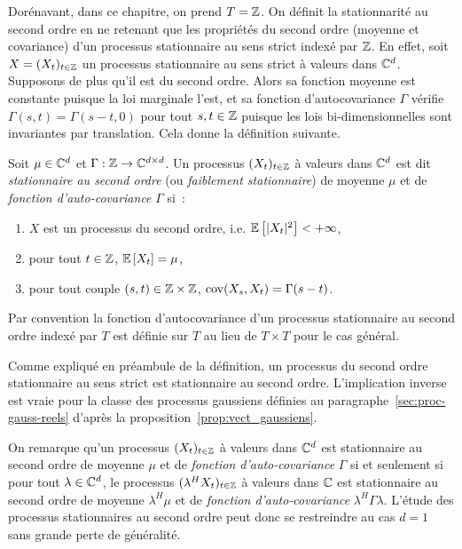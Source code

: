 Dor\'enavant, dans ce chapitre, on prend $T=\mathbb{Z}$.  On d\'efinit la stationnarit\'e
au second ordre en ne retenant que les propri\'et\'es du second ordre (moyenne et
covariance) d'un processus stationnaire au sens strict index\'e par $\mathbb{Z}$.  En
effet, soit $X=(X_{t})_{t \in \mathbb{Z}}$ un processus stationnaire au sens strict
\`a valeurs dans $\mathbb{C}^d$. Supposons de plus qu'il est du second ordre. Alors sa
fonction moyenne est constante puisque la loi marginale l'est, et sa fonction
d'autocovariance $\Gamma$ v\'erifie $\Gamma(s,t)=\Gamma(s-t,0)$ pour tout
$s,t\in\mathbb{Z}$ puisque les lois bi-dimensionnelles sont invariantes par
translation.  Cela donne la d\'efinition suivante.
\begin{definition}\label{def:statio_sec_ordre}
  Soit $\mu\in\mathbb{C}^d$ et $\Gamma:\mathbb{Z}\to\mathbb{C}^{d\times d}$.  Un processus
  $(X_{t})_{t \in \mathbb{Z}}$ \`a valeurs dans $\mathbb{C}^d$ est dit \emph{stationnaire
    au second ordre} (ou \emph{faiblement stationnaire}) de moyenne $\mu$ et de
  \emph{fonction d'auto-covariance} $\Gamma$ si~:
\begin{enumerate}[label=(\alph*)]
\item $X$ est un processus du second ordre, i.e.
${\mathbb E}\left[ |X_{t}|^2 \right]<+\infty$,
\item pour tout $t \in \mathbb{Z}$, ${\mathbb E}\left[  X_{t}
 \right]=\mu$,
\item\label{eq:diffgamma} pour tout couple $(s,t) \in \mathbb{Z} \times \mathbb{Z}$, $\mathrm{cov}(X_s,X_t)= \Gamma(s-t)$.
\end{enumerate}
\end{definition}

Par convention la fonction d'autocovariance d'un processus stationnaire au
second ordre index\'e par $T$ est d\'efinie sur $T$ au lieu de $T\times T$ pour le
cas g\'en\'eral.

Comme expliqu\'e en pr\'eambule de la d\'efinition, un processus du second ordre
stationnaire au sens strict est stationnaire au second ordre.  L'implication
inverse est vraie pour la classe des processus gaussiens d\'efinies au
paragraphe~\ref{sec:proc-gauss-reels} d'apr\`es la
proposition~\ref{prop:vect_gaussiens}.


On remarque qu'un processus $(X_{t})_{t \in \mathbb{Z}}$ \`a valeurs dans $\mathbb{C}^d$
est stationnaire au second ordre de moyenne $\mu$ et de \emph{fonction
  d'auto-covariance} $\Gamma$ si et seulement si pour tout $\lambda\in\mathbb{C}^d$,
le processus $(\lambda^HX_{t})_{t \in \mathbb{Z}}$ \`a valeurs dans $\mathbb{C}$ est
stationnaire au second ordre de moyenne $\lambda^H\mu$ et de \emph{fonction
  d'auto-covariance} $\lambda^H\Gamma\lambda$.  L'\'etude des processus
stationnaires au second ordre peut donc se restreindre au cas $d=1$ sans grande
perte de g\'en\'eralit\'e.





